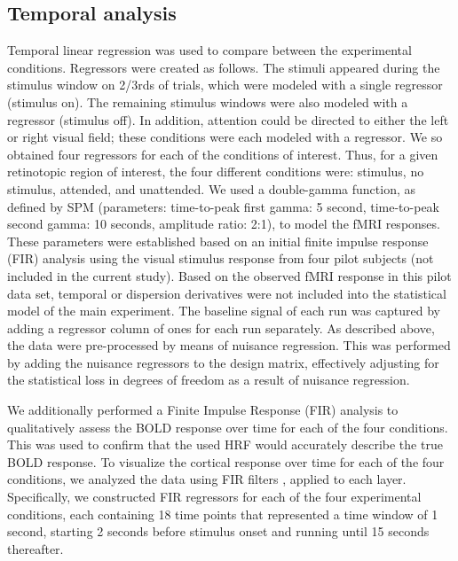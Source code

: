 \documentclass[9pt,lineno]{aperture}
\begin{document}
\subsection{Temporal analysis}
Temporal linear regression was used to compare between the experimental conditions. Regressors were created as follows. The stimuli appeared during the stimulus window on 2/3rds of trials, which were modeled with a single regressor (stimulus on). The remaining stimulus windows were also modeled with a regressor (stimulus off). In addition, attention could be directed to either the left or right visual field; these conditions were each modeled with a regressor. We so obtained four regressors for each of the conditions of interest. Thus, for a given retinotopic region of interest, the four different conditions were: stimulus, no stimulus, attended, and unattended. We used a double-gamma function, as defined by SPM (parameters: time-to-peak first gamma: 5 second, time-to-peak second gamma: 10 seconds, amplitude ratio: 2:1), to model the fMRI responses. These parameters were established based on an initial finite impulse response (FIR) analysis \citep{Friston1998} using the visual stimulus response from four pilot subjects (not included in the current study). Based on the observed fMRI response in this pilot data set, temporal or dispersion derivatives were not included into the statistical model of the main experiment. The baseline signal of each run was captured by adding a regressor column of ones for each run separately. As described above, the data were pre-processed by means of nuisance regression. This was performed by adding the nuisance regressors to the design matrix, effectively adjusting for the statistical loss in degrees of freedom as a result of nuisance regression. 

We additionally performed a Finite Impulse Response (FIR) analysis to qualitatively assess the BOLD response over time for each of the four conditions. This was used to confirm that the used HRF would accurately describe the true BOLD response. To visualize the cortical response over time for each of the four conditions, we analyzed the data using FIR filters \citep{Friston1998}, applied to each layer. Specifically, we constructed FIR regressors for each of the four experimental conditions, each containing 18 time points that represented a time window of 1 second, starting 2 seconds before stimulus onset and running until 15 seconds thereafter. 
\end{document}
